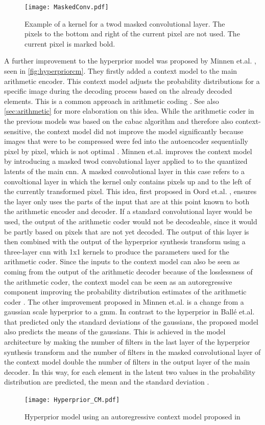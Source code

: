 \begin{figure}
\centering
\texttt{[image: MaskedConv.pdf]}
\caption[Example of masked convolutional layer]{Example of a kernel for a \ac{twod} masked convolutional layer. The pixels to the bottom and right of the current pixel are not used. The current pixel is marked bold.}
\label{fig:maskedconv}
\end{figure}

A further improvement to the hyperprior model was proposed by Minnen et.al. \citep{minnen_joint_2018}, seen in \autoref{fig:hyperpriorcm}. They firstly added a context model to the main arithmetic encoder. This context model adjusts the probability distributions for a specific image during the decoding process based on the already decoded elements. This is a common approach in arithmetic coding \citep{said_introduction_2023}. See also \autoref{sec:arithmetic} for more elaboration on this idea. While the arithmetic coder in the previous models was based on the \ac{cabac} algorithm and therefore also context-sensitive, the context model did not improve the model significantly because images that were to be compressed were fed into the autoencoder sequentially pixel by pixel, which is not optimal \citep{balle_end--end_2017}. Minnen et.al. improves the context model by introducing a masked \ac{twod} convolutional layer applied to to the quantized latents of the main \ac{cnn}. A masked convolutional layer in this case refers to a convoltional layer in which the kernel only contains pixels up and to the left of the currently transformed pixel. This idea, first proposed in Oord et.al. \citep{oord_conditional_2016}, ensures the layer only uses the parts of the input that are at this point known to both the arithmetic encoder and decoder. If a standard convolutional layer would be used, the output of the arithmetic coder would not be decodeable, since it would be partly based on pixels that are not yet decoded.  The output of this layer is then combined with the output of the hyperprior synthesis transform using a three-layer \ac{cnn} with 1x1 kernels to produce the parameters used for the arithmetic coder. Since the inputs to the context model can also be seen as coming from the output of the arithmetic decoder because of the losslessness of the arithmetic coder, the context model can be seen as an autoregressive component improving the probability distribution estimates of the arithmetic coder \citep{minnen_joint_2018}. The other improvement proposed in Minnen et.al. \citep{minnen_joint_2018} is a change from a gaussian scale hyperprior to a \ac{gmm}. In contrast to the hyperprior in Ballé et.al. \citep{balle_variational_2018} that predicted only the standard deviations of the gaussians, the proposed model also predicts the means of the gaussians. This is achieved in the model architecture by making the number of filters in the last layer of the hyperprior synthesis transform and the number of filters in the masked convolutional layer of the context model double the number of filters in the output layer of the main decoder. In this way, for each element in the latent two values in the probability distribution are predicted, the mean and the standard deviation \citep{minnen_joint_2018}.

\begin{figure}
\centering
\texttt{[image: Hyperprior\_CM.pdf]}
\caption[Joint hyperprior architecture]{Hyperprior model using an autoregressive context model proposed in \citep{minnen_joint_2018}}
\label{fig:hyperpriorcm}
\end{figure}
